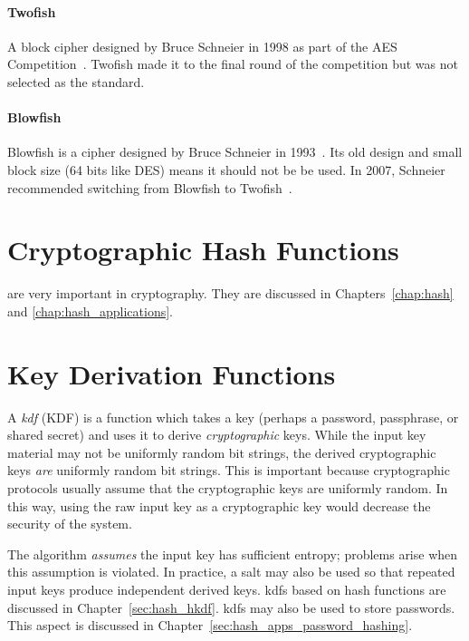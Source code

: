 \paragraph{Twofish} A \gls{block cipher} designed by Bruce Schneier in 1998
as part of the AES Competition~\cite{TwofishAlg}.
Twofish made it to the final round of the competition
but was not selected as the standard.

\paragraph{Blowfish}
Blowfish is a cipher designed by Bruce Schneier in 1993~\cite{BlowfishAlg}.
Its old design and small block size (64 bits like DES)
means it should not be be used.
In 2007, Schneier recommended
switching from Blowfish to Twofish~\cite{SchneierNews2007}.


\section{Cryptographic Hash Functions}

 are very important in cryptography.
They are discussed in Chapters~\ref{chap:hash}
and \ref{chap:hash_applications}.



\section{Key Derivation Functions}
\label{sec:kdf}

A \emph{\gls{kdf}} (KDF) is a function which takes
a key (perhaps a password, passphrase, or \gls{shared secret})
and uses it to derive \emph{cryptographic} keys.
While the input key material may not be uniformly random bit strings,
the derived cryptographic keys \emph{are} uniformly random bit strings.
This is important because cryptographic protocols usually assume
that the cryptographic keys are uniformly random.
In this way, using the raw input key as a cryptographic key
would decrease the security of the system.

The algorithm \emph{assumes} the input key has sufficient entropy;
problems arise when this assumption is violated.
In practice, a \gls{salt} may also be used so that repeated
input keys produce independent derived keys.
\Glspl{kdf} based on \glspl{hash function} are discussed
in Chapter~\ref{sec:hash_hkdf}.
\Glspl{kdf} may also be used to store passwords.
This aspect is discussed in
Chapter~\ref{sec:hash_apps_password_hashing}.




